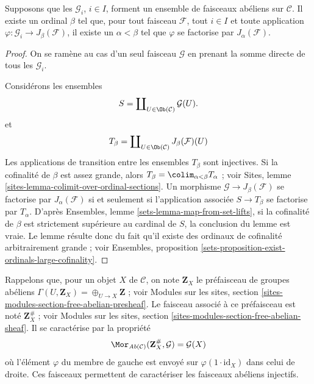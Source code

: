 \begin{lemma}
\label{lemma-map-into-smaller}
Supposons que les $\mathcal{G}_i$, $i\in I$, forment un ensemble de faisceaux
abéliens sur $\mathcal{C}$. Il existe un ordinal $\beta$ tel que, pour tout
faisceau $\mathcal{F}$, tout $i\in I$ et toute application
$\varphi : \mathcal{G}_i \to J_\beta(\mathcal{F})$, il existe un
$\alpha < \beta$ tel que $ \varphi $ se factorise par
$J_\alpha(\mathcal{F})$.
\end{lemma}

\begin{proof}
On se ramène au cas d'un seul faisceau $\mathcal{G}$ en prenant la somme
directe de tous les $\mathcal{G}_i$.

\medskip\noindent
Considérons les ensembles
$$
S = \coprod\nolimits_{U \in \Ob(\mathcal{C})} \mathcal{G}(U).
$$
et
$$
T_\beta
=
\coprod\nolimits_{U \in \Ob(\mathcal{C})} J_\beta(\mathcal{F})(U)
$$
Les applications de transition entre les ensembles $T_\beta$ sont injectives.
Si la cofinalité de $\beta$ est assez grande, alors
$T_\beta = \colim_{\alpha < \beta} T_\alpha$ ; voir
Sites, lemme \ref{sites-lemma-colimit-over-ordinal-sections}. Un morphisme
$\mathcal{G} \to J_\beta(\mathcal{F})$ se factorise par
$J_\alpha(\mathcal{F})$ si et seulement si l'application associée
$S \to T_\beta$ se factorise par $T_\alpha$. D'après
Ensembles, lemme \ref{sets-lemma-map-from-set-lifts}, si la cofinalité de $\beta$
est strictement supérieure au cardinal de $S$, la conclusion du lemme est
vraie. Le lemme résulte donc du fait qu'il existe des ordinaux de cofinalité
arbitrairement grande ; voir
Ensembles, proposition \ref{sets-proposition-exist-ordinals-large-cofinality}.
\end{proof}

\noindent
Rappelons que, pour un objet $X$ de $\mathcal{C}$, on note $\mathbf{Z}_X$ le
préfaisceau de groupes abéliens $\Gamma(U, \mathbf{Z}_X) =
\oplus_{U \to X} \mathbf{Z}$ ; voir
Modules sur les sites, section \ref{sites-modules-section-free-abelian-presheaf}.
Le faisceau associé à ce préfaisceau est noté $\mathbf{Z}_X^\#$ ; voir
Modules sur les sites, section \ref{sites-modules-section-free-abelian-sheaf}.
Il se caractérise par la propriété
\begin{equation}
\label{equation-free-sheaf-on}
\Mor_{\textit{Ab}(\mathcal{C})}(\mathbf{Z}_X^\#, \mathcal{G})
=
\mathcal{G}(X)
\end{equation}
où l'élément $\varphi$ du membre de gauche est envoyé sur
$\varphi(1 \cdot \text{id}_X)$ dans celui de droite. Ces faisceaux permettent
de caractériser les faisceaux abéliens injectifs.

